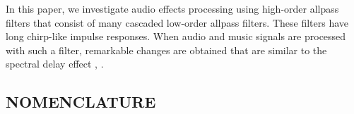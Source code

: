 \documentclass{aes2e}
\begin{document}
\begin{extract}
In this paper, we investigate audio effects processing using high-order allpass filters that consist of many cascaded low-order allpass filters. These filters have long chirp-like impulse responses. When audio and music signals are processed with such a filter, remarkable changes are obtained that are similar to the spectral delay effect  \cite{DEK3}, \cite{DEK4}.


\begin{nomenclature}[PAMPs]
\subsection*{NOMENCLATURE}



\end{nomenclature}


\end{extract}
\end{document}
